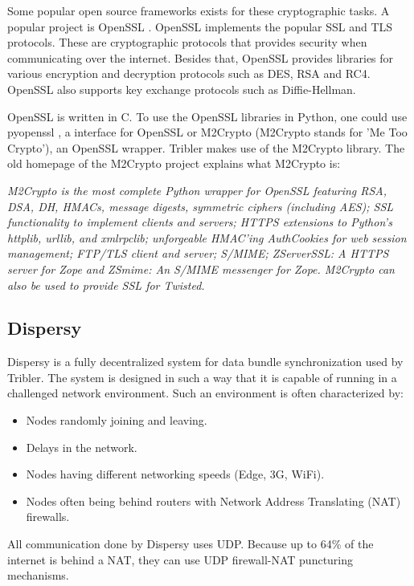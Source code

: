 		Some popular open source frameworks exists for these cryptographic tasks. A popular project is OpenSSL \cite{openssl}. OpenSSL implements the popular SSL and TLS protocols. These are cryptographic protocols that provides security when communicating over the internet. Besides that, OpenSSL provides libraries for various encryption and decryption protocols such as DES, RSA and RC4. OpenSSL also supports key exchange protocols such as Diffie-Hellman.
		
		OpenSSL is written in C. To use the OpenSSL libraries in Python, one could use pyopenssl \cite{pyopensslgithub}, a interface for OpenSSL or M2Crypto \cite{m2cryptogithub} (M2Crypto stands for 'Me Too Crypto'), an OpenSSL wrapper. Tribler makes use of the M2Crypto library. The old homepage of the M2Crypto project \cite{m2crypto} explains what M2Crypto is:
		
		\emph{M2Crypto is the most complete Python wrapper for OpenSSL featuring RSA, DSA, DH, HMACs, message digests, symmetric ciphers (including AES); SSL functionality to implement clients and servers; HTTPS extensions to Python's httplib, urllib, and xmlrpclib; unforgeable HMAC'ing AuthCookies for web session management; FTP/TLS client and server; S/MIME; ZServerSSL: A HTTPS server for Zope and ZSmime: An S/MIME messenger for Zope. M2Crypto can also be used to provide SSL for Twisted.}
		
	\subsection{Dispersy}
		Dispersy \cite{zeilemaker2013dispersy} is a fully decentralized system for data bundle synchronization used by Tribler. The system is designed in such a way that it is capable of running in a challenged network environment. Such an environment is often characterized by:
		\begin{itemize}
			\item Nodes randomly joining and leaving.
			\item Delays in the network.
			\item Nodes having different networking speeds (Edge, 3G, WiFi).
			\item Nodes often being behind routers with Network Address Translating (NAT) firewalls.
		\end{itemize}
		
		All communication done by Dispersy uses UDP. Because up to 64\% of the internet is behind a NAT, they can use UDP firewall-NAT puncturing mechanisms.
		
